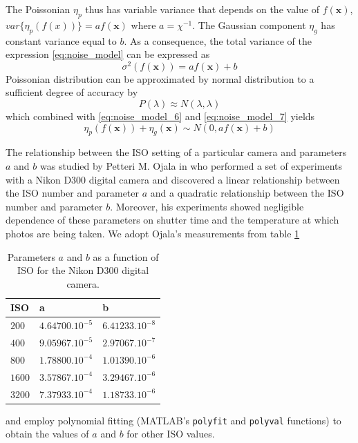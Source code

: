 \documentclass[12pt,notitlepage]{report}
\begin{document}
The Poissonian $\eta_p$ thus has variable variance that depends on the value of $f(\mathbf{x})$, $var\lbrace \eta_p (f(x) ) \rbrace = af(\mathbf{x})$ where $a=\chi^{-1}$. The Gaussian component $\eta_g$ has constant variance equal to $b$. As a consequence, the total variance of the expression \ref{eq:noise_model} can be expressed as
\begin{equation}
\label{eq:noise_model_7}
	\sigma^{2}(f(\mathbf{x})) = a f(\mathbf{x}) + b
\end{equation}
Poissonian distribution can be approximated by normal distribution to a sufficient degree of accuracy by
\begin{equation}
\label{eq:noise_model_8}
	P(\lambda) \approx N(\lambda, \lambda)
\end{equation}
which combined with \ref{eq:noise_model_6} and \ref{eq:noise_model_7} yields 
\begin{equation}
\label{eq:noise_model_9}
	\eta_p(f(\mathbf{x})) +  \eta_g(\mathbf{x}) \sim N(0, a f(\mathbf{x}) + b)
\end{equation}

The relationship between the ISO setting of a particular camera and parameters $a$ and $b$ was studied by Petteri M. Ojala in \cite{ojal08} who performed a set of experiments with a Nikon D300 digital camera and discovered a linear relationship between the ISO number and parameter $a$ and a quadratic relationship between the ISO number and parameter $b$. Moreover, his experiments showed negligible dependence of these parameters on shutter time and the temperature at which photos are being taken. 
We adopt Ojala's measurements from table \ref{tab:ojal}
\begin{table}
  \centering
  \begin{tabular}{ |l | l | l | }
    \hline
	ISO & a & b \\ \hline
    $200$ & $4.64700.10^{-5}$& $6.41233.10^{-8}$ \\ \hline
    $400$ & $9.05967.10^{-5}$ & $2.97067.10^{-7}$ \\ \hline
    $800$ & $1.78800.10^{-4}$ & $1.01390.10^{-6}$ \\ \hline
    $1600$ & $3.57867.10^{-4}$ & $3.29467.10^{-6}$ \\ \hline
    $3200$ & $7.37933.10^{-4}$ & $1.18733.10^{-6}$ \\
    \hline
  \end{tabular}
  \caption{Parameters $a$ and $b$ as a function of ISO for the Nikon D300 digital camera.}
  \label{tab:ojal}
\end{table}
and employ polynomial fitting (MATLAB's \texttt{polyfit} and \texttt{polyval} functions) to obtain the values of $a$ and $b$ for other ISO values. 
\end{document}
